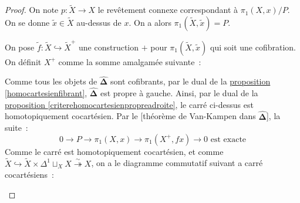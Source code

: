 \documentclass{amsart}
\newcommand{\sref}[2]{\hyperref[#2]{#1 \ref*{#2}}}
\theoremstyle{plain}
\theoremstyle{definition}
\theoremstyle{remark}
\newcommand{\DEns}{\widehat{\mathbf{\Delta}}}
\newcommand{\ra}{\rightarrow}
\newcommand{\exa}[3]{0\ra {#1}\ra {#2}\ra {#3}\ra 0}
\begin{document}
\begin{proof}
  On note $p:\tilde{X}\ra X$ le revêtement connexe correspondant à $\pi_1(X,x)/P$. On se donne $\tilde{x}\in \tilde{X}$ au-dessus de $x$.
  On a alors $\pi_1(\tilde{X},\tilde{x})=P$.

  On pose $\tilde{f}:\tilde{X}\hookrightarrow \tilde{X}^+$ une construction $+$ pour $\pi_1(\tilde{X},\tilde{x})$ qui soit une cofibration.
  On définit $X^+$ comme la somme amalgamée suivante~:
  \begin{center}
  \end{center}
  Comme tous les objets de $\DEns$ sont cofibrants, par le dual de la \sref{proposition}{homocartesienfibrant}, 
  $\DEns$ est propre à gauche.
  Ainsi, par le dual de la \sref{proposition}{criterehomocartesienpropreadroite}, le carré ci-dessus est homotopiquement cocartésien.
  Par le [théorème de Van-Kampen dans $\DEns$], la suite~:
  $$\exa{P}{\pi_1(X,x)}{\pi_1(X^+,fx)}\text{ est exacte}$$
  Comme le carré est homotopiquement cocartésien, et comme $\tilde{X}\hookrightarrow\tilde{X}\times\Delta^1\sqcup_{X}X\overset{\sim}{\twoheadrightarrow}X$,
  on a le diagramme commutatif suivant a carré cocartésiens~:
  \begin{center}
\end{center}
\end{proof}
\end{document}
